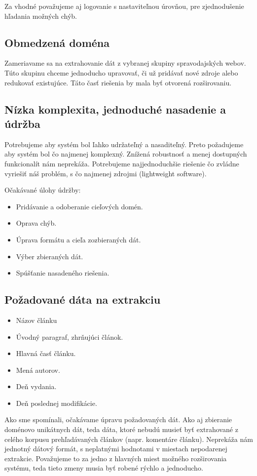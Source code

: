 Za vhodné považujeme aj logovanie s nastaviteľnou úrovňou, pre zjednodušenie hľadania možných chýb.

\subsection{Obmedzená doména}
Zameriavame sa na extrahovanie dát z vybranej skupiny spravodajských webov. Túto skupinu chceme jednoducho upravovať, či už pridávať nové zdroje alebo redukovať existujúce. Táto časť riešenia by mala byť otvorená rozširovaniu. 

\subsection{Nízka komplexita, jednoduché nasadenie a údržba}
Potrebujeme aby systém bol ľahko udržateľný a nasaditeľný. Preto požadujeme aby systém bol čo najmenej komplexný. Znížená robustnosť a menej dostupných funkcionalít nám neprekáža. Potrebujeme najjednoduchšie riešenie čo zvládne vyriešiť náš problém, s čo najmenej zdrojmi (lightweight software). 

Očakávané úlohy údržby: 
\begin{itemize}
  \item Pridávanie a odoberanie cieľových domén.
  \item Oprava chýb.
  \item Úprava formátu a cieľa zozbieraných dát.
  \item Výber zbieraných dát.
  \item Spúšťanie nasadeného riešenia. 
\end{itemize}


\subsection{Požadované dáta na extrakciu}
\begin{itemize}
  \item Názov článku
  \item Úvodný paragraf, zhrňujúci článok.
  \item Hlavná časť článku.
  \item Mená autorov.
  \item Deň vydania. 
  \item Deň poslednej modifikácie.
\end{itemize}

Ako sme spomínali, očakávame úpravu požadovaných dát. Ako aj zbieranie doménovo unikátnych dát, teda dáta, ktoré nebudú musieť byť extrahované z celého korpusu prehľadávaných článkov (napr. komentáre článku). Neprekáža nám jednotný dátový formát, s neplatnými hodnotami v miestach nepodarenej extrakcie. 
Považujeme to za jedno z hlavných miest možného rozširovania systému, teda tieto zmeny musia byť robené rýchlo a jednoducho. 

